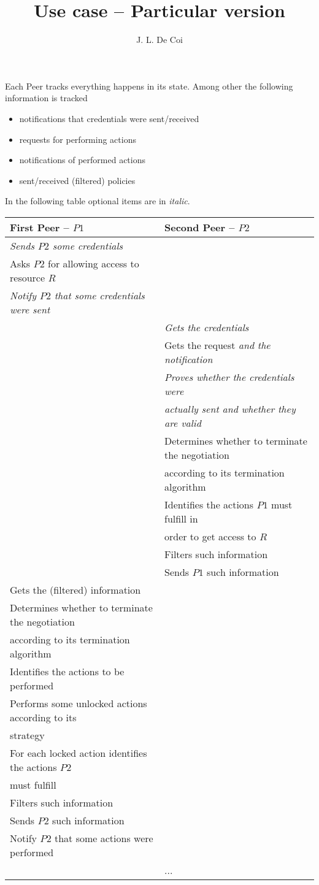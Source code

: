 \documentclass{article}
\begin{document}
\title{Use case -- Particular version}
\author{J. L. De Coi}
\maketitle

Each Peer tracks everything happens in its state. Among other the following information is tracked

\begin{itemize}
	\item notifications that credentials were sent/received
	\item requests for performing actions
	\item notifications of performed actions
	\item sent/received (filtered) policies
\end{itemize}

In the following table optional items are in \textit{italic}.

\begin{table}
\begin{tabular}{|l|l|}
\hline
\textbf{First Peer -- $P1$} & \textbf{Second Peer -- $P2$} \\
\hline
\textit{Sends $P2$ some credentials} & \\
Asks $P2$ for allowing access to resource $R$ & \\
\textit{Notify $P2$ that some credentials were sent} & \\
\hline
& \textit{Gets the credentials} \\
& Gets the request \textit{and the notification} \\
& \textit{Proves whether the credentials were} \\
& \textit{actually sent and whether they are valid} \\
& Determines whether to terminate the negotiation \\
& according to its termination algorithm \\
& Identifies the actions $P1$ must fulfill in \\
& order to get access to $R$ \\
& Filters such information \\
& Sends $P1$ such information \\
\hline
Gets the (filtered) information & \\
Determines whether to terminate the negotiation & \\
according to its termination algorithm & \\
Identifies the actions to be performed & \\
Performs some unlocked actions according to its & \\
strategy & \\
For each locked action identifies the actions $P2$ & \\
must fulfill & \\
Filters such information & \\
Sends $P2$ such information & \\
Notify $P2$ that some actions were performed & \\
\hline
& ... \\
\hline
\end{tabular}
\end{table}
\end{document}
